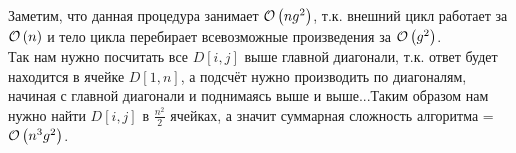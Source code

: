 Заметим, что данная процедура занимает $\mathcal{O}\left(ng^2\right)$, т.к. внешний цикл работает за $\mathcal{O}\left(n\right)$ и тело цикла перебирает
всевозможные произведения за $\mathcal{O}\left(g^2\right)$.\\
Так нам нужно посчитать все $D[i,j]$ выше главной диагонали, т.к. ответ будет находится в ячейке $D[1,n]$, а подсчёт нужно производить по диагоналям, начиная с главной диагонали и поднимаясь выше и выше...Таким образом нам нужно найти $D[i,j]$
в $\frac{n^2}{2}$ ячейках, а значит суммарная сложность алгоритма = $\mathcal{O}\left(n^3g^2\right)$. \xqed
